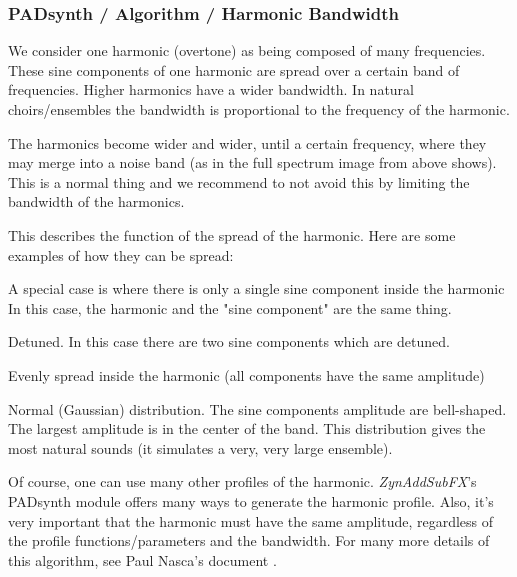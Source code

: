 
\subsubsection{PADsynth / Algorithm / Harmonic Bandwidth}
\label{subsubsec:padsynth_algorithm_harmonic_bandwidth}

   We consider one harmonic (overtone) as being composed of many frequencies.
   These sine components of one harmonic are spread over a certain band of
   frequencies.  Higher harmonics have a wider bandwidth. In natural
   choirs/ensembles the bandwidth is proportional to the frequency of the
   harmonic.

%

   The harmonics become wider and wider, until a certain frequency, where
   they may merge into a noise band (as in the full spectrum image from above
   shows). This is a normal thing and we recommend to not avoid this by
   limiting the bandwidth of the harmonics.


   This describes the function of the spread of the harmonic.
   Here are some examples of how they can be spread:

   \begin{enumber}
      \item  A special case is where there is only a single sine component
         inside the harmonic In this case, the harmonic and the "sine
         component" are the same thing.
      \item  Detuned. In this case there are two sine components which are
         detuned.
      \item  Evenly spread inside the harmonic (all components have the same
         amplitude)
      \item  Normal (Gaussian) distribution. The sine components amplitude are
         bell-shaped. The largest amplitude is in the center of the band. This
         distribution gives the most natural sounds (it simulates a very, very
         large ensemble).
   \end{enumber}

   Of course, one can use many other profiles of the harmonic.
   \textsl{ZynAddSubFX}'s PADsynth module offers many ways to generate the
   harmonic profile.  Also, it's very important that the harmonic must have the
   same amplitude, regardless of the profile functions/parameters and the
   bandwidth.
   For many more details of this algorithm, see Paul Nasca's document
   \cite{zyndoc}.

